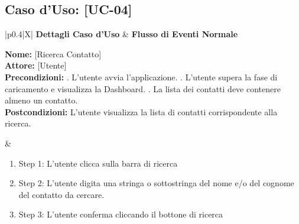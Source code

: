 \documentclass[a4paper,12pt]{article}
\begin{document}
    \subsection{Caso d'Uso: [UC-04]}

    \begin{table}[htbp]
        \centering
        \begin{tabularx}{\textwidth}{|p{0.4\textwidth}|X|}
            \hline
            \textbf{Dettagli Caso d'Uso} & \textbf{Flusso di Eventi Normale} \\
            \hline
            \parbox[t]{0.38\textwidth}{%
                \textbf{Nome:} [Ricerca Contatto] \\[1ex]
                \textbf{Attore:} [Utente] \\[1ex]
                \textbf{Precondizioni:} . L'utente avvia l'applicazione. . L'utente supera la fase di caricamento e visualizza la Dashboard. . La lista dei contatti deve contenere almeno un contatto. \newline \\[1ex]
                \textbf{Postcondizioni:} \newline L'utente visualizza la lista di contatti corrispondente alla ricerca.\newline
            }
            &
            \parbox[t]{\linewidth}{%
                \begin{enumerate}[noitemsep, leftmargin=*]
                    \item Step 1: L'utente clicca sulla barra di ricerca
                    \item Step 2: L'utente digita una stringa o sottostringa del nome e/o del cognome del contatto da cercare.
                    \item Step 3: L'utente conferma cliccando il bottone di ricerca
                \end{enumerate}
            } \\
            \hline
             \\
            \hline
        \end{tabularx}
        \caption{Ricerca Contatto}
    \end{table}
    \newpage
\end{document}
